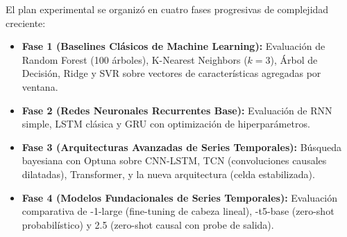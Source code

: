 El plan experimental se organizó en cuatro fases progresivas de complejidad creciente:
\begin{itemize}
    \item \textbf{Fase 1 (Baselines Clásicos de Machine Learning):} Evaluación de Random Forest (100 árboles), K-Nearest Neighbors ($k=3$), Árbol de Decisión, Ridge y SVR sobre vectores de características agregadas por ventana.
    \item \textbf{Fase 2 (Redes Neuronales Recurrentes Base):} Evaluación de RNN simple, LSTM clásica y GRU con optimización de hiperparámetros.
    \item \textbf{Fase 3 (Arquitecturas Avanzadas de Series Temporales):} Búsqueda bayesiana con Optuna sobre CNN-LSTM, TCN (convoluciones causales dilatadas), Transformer, \patchtst{} y la nueva arquitectura \xlstm{} (celda \slstm{} estabilizada).
    \item \textbf{Fase 4 (Modelos Fundacionales de Series Temporales):} Evaluación comparativa de \moment{}-1-large (fine-tuning de cabeza lineal), \chronos{}-t5-base (zero-shot probabilístico) y \timesfm{} 2.5 (zero-shot causal con probe de salida).
\end{itemize}
